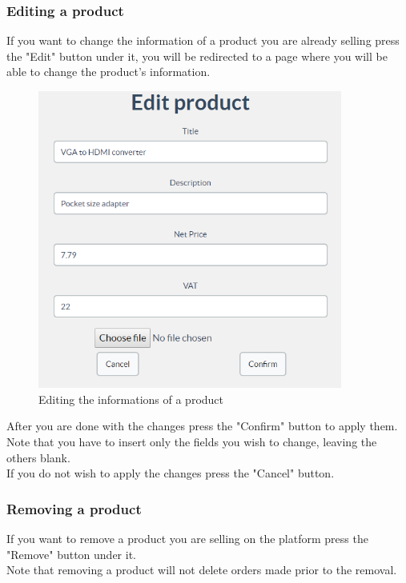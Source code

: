 		\subsubsection{Editing a product}
		If you want to change the information of a product you are already 
		selling press the "Edit" button under it, you will be redirected to a 
		page where you will be able to change the product's information.
		\begin{figure}[H]
			\includegraphics[width=10cm]{res/images/edit_product.png}
			\centering
			\caption{Editing the informations of a product}
		\end{figure}
		\noindent After you are done with the changes press the "Confirm" 
		button to apply them.\\
		Note that you have to insert only the fields you wish to change, leaving
		 the others blank.
		\\If you do not wish to apply the changes press the "Cancel" button.
		\subsubsection{Removing a product}
		If you want to remove a product you are selling on the platform press 
		the	"Remove" button under it.
		\\Note that removing a product will not delete orders made prior to the 
		removal. 
